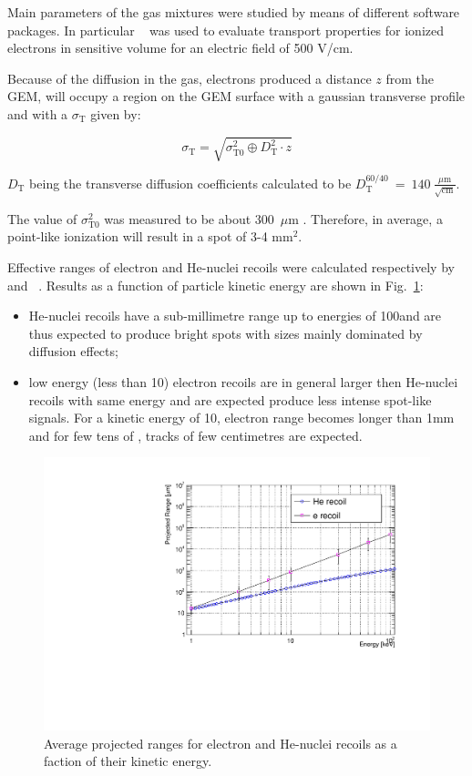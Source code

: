 \documentclass[12pt]{iopart}
\begin{document}
Main parameters of the gas mixtures were studied by means of different software packages. In particular \garfield~\cite{bib:garfield,bib:garfield1} was used to evaluate transport properties for ionized electrons in sensitive volume for an electric field of 500 V/cm.

Because of the diffusion in the gas, electrons produced  a distance $z$ from the GEM, will occupy a region on the GEM surface with a gaussian transverse profile and with a $\sigma_{\mathrm{T}}$ given by:

\begin{equation}
\label{eq:diff}
\sigma_{\mathrm{T}} = \sqrt{\sigma^2_{\mathrm{T0}} \oplus D^2_{\mathrm{T}} \cdot z} 
\end{equation}


$D_{\mathrm{T}}$ being the transverse diffusion coefficients calculated to be
$
D_{\mathrm{T}}^{60/40}~=~140~\frac{\mu{\mathrm{m}}}{\sqrt{\mathrm{cm}}}.
$

The value of $\sigma^2_{\mathrm{T0}}$ was measured to be about 300~$\mu$m \cite{bib:btf,bib:fe55New}. Therefore, in average, a point-like ionization will result in a spot of 3-4 mm$^2$.

Effective ranges of electron and He-nuclei recoils were calculated
respectively by \GEANTfour~\cite{bib:geant} and
\SRIM~\cite{bib:srim}. Results as a function of particle kinetic
energy are shown in Fig.~\ref{fig:range}:
\begin{itemize}
    \item He-nuclei recoils have a sub-millimetre range up to energies
      of 100\keV and are thus expected to produce bright spots with
      sizes mainly dominated by diffusion effects;
    \item low energy (less than 10\keV) electron recoils are in
      general larger then He-nuclei recoils with same energy and are
      expected produce less intense spot-like signals. For a kinetic
      energy of 10\keV, electron range becomes longer than 1\unit{mm}
      and for few tens of \keV, tracks of few centimetres are
      expected.
\end{itemize}

\begin{figure}[ht]
  \begin{center}
    \includegraphics[width=0.49\linewidth]{figures/range_ER_NR.pdf}
    \caption{Average projected ranges for electron and He-nuclei recoils as a faction of their kinetic energy.
      \label{fig:range}}
  \end{center}
\end{figure}
\end{document}
